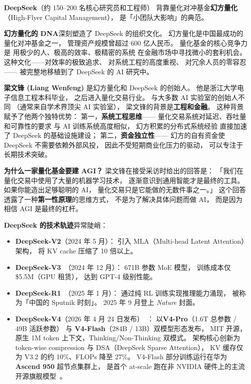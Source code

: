 \textbf{DeepSeek}（约 150--200 名核心研究员和工程师）
背靠量化对冲基金\textbf{幻方量化}（High-Flyer Capital Management），
是「小团队大影响」的典范。

\textbf{幻方量化的 DNA}深刻塑造了 DeepSeek 的组织文化。
幻方量化是中国最成功的量化对冲基金之一，
管理资产规模曾超过 600 亿人民币。
量化基金的核心竞争力是
用极少的人、极高的效率、极精密的系统
在金融市场中寻找微小的套利机会。
这种文化——对效率的极致追求、
对系统工程的高度重视、
对冗余人员的零容忍——
被完整地移植到了 DeepSeek 的 AI 研究中。

\textbf{梁文锋 (Liang Wenfeng)}
是幻方量化和 DeepSeek 的创始人。
他是浙江大学电子信息工程本科毕业，
之后进入量化交易行业。
与大多数 AI 实验室的创始人不同
（通常来自学术界顶尖 AI 实验室），
梁文锋的背景是\textbf{工程和金融}。
这种背景赋予了他两个独特优势：
第一，\textbf{系统工程思维}——
量化交易系统对延迟、吞吐量和可靠性的要求
与 AI 训练系统高度相似，
幻方积累的分布式系统经验
直接加速了 DeepSeek 的基础设施建设；
第二，\textbf{资金独立性}——
幻方的自有资金使 DeepSeek 不需要依赖外部风投，
因此不受短期商业化压力的驱动，
可以专注于长期技术突破。

\textbf{为什么一家量化基金要建 AGI？}
梁文锋在接受采访时给出的回答是：
「我们在量化交易中使用了大量的机器学习技术，
逐渐意识到通用智能才是最终的工具。
如果你能造出足够聪明的 AI，
量化交易只是它能做的无数件事之一。」
这个回答透露了一种\textbf{第一性原理}的思维方式，
不是为了解决具体问题而做 AI，
而是因为相信 AGI 是最终的杠杆。

\textbf{DeepSeek 的技术轨迹}异常陡峭：
\begin{itemize}[noitemsep]
  \item \textbf{DeepSeek-V2}（2024 年 5 月）：
        引入 MLA（Multi-head Latent Attention）架构，
        将 KV cache 压缩了 10 倍以上。
  \item \textbf{DeepSeek-V3}~\cite{deepseekv3}（2024 年 12 月）：
        671B 参数 MoE 模型，
        训练成本仅 \$5.5M（GPU 租赁），
        达到 GPT-4 级别性能。
  \item \textbf{DeepSeek-R1}~\cite{deepseekr1}（2025 年 1 月）：
        通过纯 RL 训练实现推理能力涌现，
        被称为「中国的 Sputnik 时刻」。
        2025 年 9 月登上 \textit{Nature} 封面。
  \item \textbf{DeepSeek-V4}（2026 年 4 月 24 日发布）~\cite{deepseek_v4_release_2026}：
        以\textbf{V4-Pro}（1.6T 总参数 / 49B 活跃参数）
        与 \textbf{V4-Flash}（284B / 13B）双模型形态发布，
        MIT 开源，原生 1M token 上下文，Thinking/Non-Thinking 双模式。
        架构核心创新为 token-wise compression 与 DSA（DeepSeek Sparse Attention），
        KV 缓存仅为 V3.2 的约 10\%、FLOPs 降至 27\%。
        V4-Flash 部分训练运行在华为 \textbf{Ascend 950} 超节点集群上，
        是首个 at-scale 跑在非 NVIDIA 硬件上的主流开源旗舰模型~\cite{deepseek_v4_huawei_2026}。
\end{itemize}


